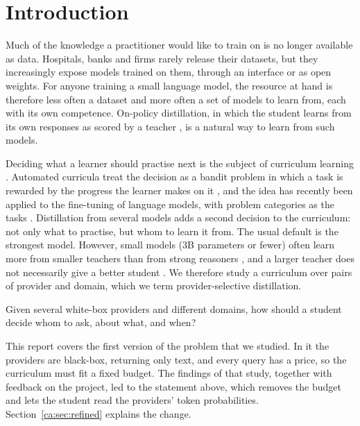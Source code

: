 \chapter{Introduction}
\label{ca:chap:intro}

Much of the knowledge a practitioner would like to train on is no longer available as
data. Hospitals, banks and firms rarely release their datasets, but they increasingly
expose models trained on them, through an interface or as open weights. For anyone training
a small language model, the resource at hand is therefore less often a dataset and more
often a set of models to learn from, each with its own competence. On-policy distillation,
in which the student learns from its own responses as scored by a teacher
\autocite{agarwal_gkd_2024,gu_minillm_2024}, is a natural way to learn from such models.

Deciding what a learner should practise next is the subject of curriculum learning
\autocite{bengio_curriculum_2009}. Automated curricula treat the decision as a bandit
problem in which a task is rewarded by the progress the learner makes on it
\autocite{graves_curriculum_2017,matiisen_tscl_2017}, and the idea has recently been
applied to the fine-tuning of language models, with problem categories as the tasks
\autocite{chen_sec_2025}. Distillation from several models adds a second decision to the
curriculum: not only what to practise, but whom to learn it from. The usual default is the
strongest model. However, small models (3B parameters or fewer) often learn more from
smaller teachers than from strong reasoners \autocite{li_learnability_gap_2025}, and a
larger teacher does not necessarily give a better student \autocite{guo_lada_2026}. We
therefore study a curriculum over pairs of provider and domain, which we term
provider-selective distillation.

\begin{mdframed}[backgroundcolor=bg, linewidth=0pt, innertopmargin=8pt,
  innerbottommargin=8pt]
Given several white-box providers and different domains, how should a student decide whom
to ask, about what, and when?
\end{mdframed}

This report covers the first version of the problem that we studied. In it the providers
are black-box, returning only text, and every query has a price, so the curriculum must
fit a fixed budget. The findings of that study, together with feedback on the project, led
to the statement above, which removes the budget and lets the student read the providers'
token probabilities. Section~\ref{ca:sec:refined} explains the change.

